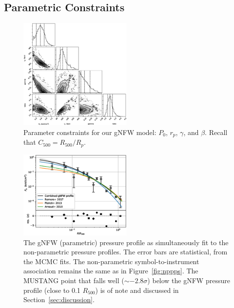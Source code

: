 \documentclass[twocolumn,traditabstract]{aa}
\begin{document}

\subsection{Parametric Constraints}
\label{sec:parametric}

\begin{figure}[!h]
  \centering
  \includegraphics[width=0.5\textwidth]{NIKA_ml_deproj_figs/Real_Joint_gNFW_Real_11011111_2500S_500B_100W_contour_p16cosmo.eps}
  \caption{Parameter constraints for our gNFW model: $P_0$, $r_p$, $\gamma$, and $\beta$. Recall that $C_{500} = R_{500} / R_p$.}
  \label{fig:joint_constraints}
\end{figure}
\begin{figure}[!h]
  \centering
  \includegraphics[width=0.5\textwidth]{NIKA_ml_deproj_figs/Real_Joint_gNFW_Power_Real_11011111_2500S_500B_100W_gNFW_pressure_w_NP_pts_v2_p16cosmo.eps}
  \caption{The gNFW (parametric) pressure profile as simultaneously fit to the non-parametric pressure profiles.
    The error bars are statistical, from the MCMC fits.
    The non-parametric symbol-to-instrument association remains the same as in Figure~\ref{fig:nppps}.
    The MUSTANG point that falls well ($\sim-2.8\sigma$) below the gNFW pressure profile (close to 0.1 $R_{500}$) is of
    note and discussed in Section~\ref{sec:discussion}.}
  \label{fig:joint_pressure}
\end{figure}
\end{document}
